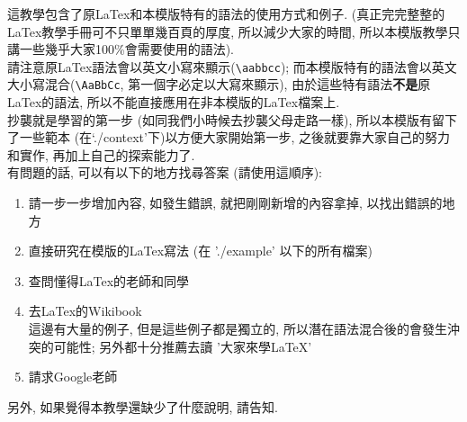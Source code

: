 

這教學包含了原LaTex和本模版特有的語法的使用方式和例子. (真正完完整整的LaTex教學手冊可不只單單幾百頁的厚度, 所以減少大家的時間, 所以本模版教學只講一些幾乎大家100\%會需要使用的語法).\\

請注意原LaTex語法會以英文小寫來顯示(\verb|\aabbcc|); 而本模版特有的語法會以英文大小寫混合(\verb|\AaBbCc|, 第一個字必定以大寫來顯示), 由於這些特有語法\textbf{不是}原LaTex的語法, 所以不能直接應用在非本模版的LaTex檔案上.\\

抄襲就是學習的第一步 (如同我們小時候去抄襲父母走路一樣), 所以本模版有留下了一些範本 (在`./context'下)以方便大家開始第一步, 之後就要靠大家自己的努力和實作, 再加上自己的探索能力了.\\

有問題的話, 可以有以下的地方找尋答案 (請使用這順序):
\begin{enumerate}
  \item 請一步一步增加內容, 如發生錯誤, 就把剛剛新增的內容拿掉, 以找出錯誤的地方
  \item 直接研究在模版的LaTex寫法 (在 './example' 以下的所有檔案)
  \item 查問懂得LaTex的老師和同學
  \item 去LaTex的Wikibook \\
        這邊有大量的例子, 但是這些例子都是獨立的, 所以潛在語法混合後的會發生沖突的可能性; 另外都十分推薦去讀 '大家來學LaTeX' 
  \item 請求Google老師
\end{enumerate}

另外, 如果覺得本教學還缺少了什麼說明, 請告知.\\

\newpage
\newpage
\newpage
\newpage
\newpage
\newpage
\newpage
\newpage

\EndChapter
